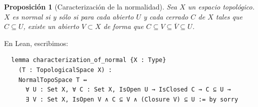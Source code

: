 \documentclass{article}
\newtheorem{proposition}{Proposición}[section]
\begin{document}
\begin{proposition}[Caracterización de la normalidad]
  Sea $X$ un espacio topológico. $X$ es normal si y sólo si para cada abierto $U$ y cada cerrado $C$ de $X$ tales que $C \subseteq U$, existe un abierto $V \subset X$ de forma que $C \subseteq V \subseteq \overline{V} \subseteq U$.
\end{proposition}

En Lean, escribimos:

\begin{lstlisting}
  lemma characterization_of_normal {X : Type}
    (T : TopologicalSpace X) :
    NormalTopoSpace T ↔
      ∀ U : Set X, ∀ C : Set X, IsOpen U → IsClosed C → C ⊆ U →
      ∃ V : Set X, IsOpen V ∧ C ⊆ V ∧ (Closure V) ⊆ U := by sorry
\end{lstlisting}
\end{document}
